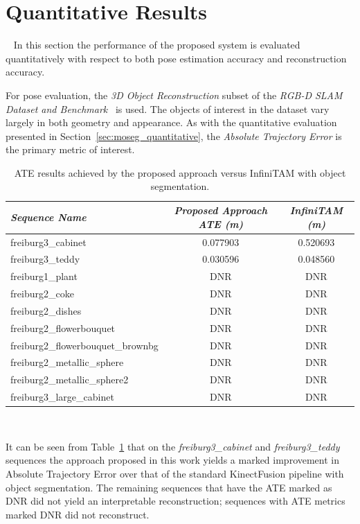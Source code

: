 \section{Quantitative Results}
~\label{sec:probobj_quantitative}
In this section the performance of the proposed system is evaluated quantitatively with respect 
to both pose estimation accuracy and reconstruction accuracy. 

For pose evaluation, the \textit{3D Object Reconstruction} subset of the 
\textit{RGB-D SLAM Dataset and Benchmark}~\cite{Sturm2012} is used. The objects of interest in 
the dataset vary largely in both geometry and appearance. As with the quantitative 
evaluation presented in Section~\ref{sec:moseg_quantitative}, the 
\textit{Absolute Trajectory Error} is the primary metric of interest.
\begin{table}[!htbp]
  \centering
  \begin{tabular}{l c c}
    \emph{Sequence Name} & \emph{Proposed Approach ATE (m)} & \emph{InfiniTAM (m)}\\
    \midrule
    \textsf{freiburg3\_cabinet} & 0.077903 & 0.520693\\
    \textsf{freiburg3\_teddy}   & 0.030596 & 0.048560 \\
    \textsf{freiburg1\_plant}   & DNR & DNR \\
    \textsf{freiburg2\_coke}   & DNR & DNR \\
    \textsf{freiburg2\_dishes}   & DNR & DNR \\
    \textsf{freiburg2\_flowerbouquet}   & DNR & DNR \\
    \textsf{freiburg2\_flowerbouquet\_brownbg}   & DNR & DNR \\
    \textsf{freiburg2\_metallic\_sphere}   & DNR & DNR \\
    \textsf{freiburg2\_metallic\_sphere2}   & DNR & DNR \\
    \textsf{freiburg3\_large\_cabinet}   & DNR & DNR
  \end{tabular}
  \caption[Probabilistic Object Reconstruction ATE]
  {ATE results achieved by the proposed approach versus InfiniTAM with object segmentation.}
~\label{table:probobj_ate}
\end{table}

It can be seen from Table~\ref{table:probobj_ate} that on the \textit{freiburg3\_cabinet} 
and \textit{\textsf{freiburg3\_teddy}} sequences the approach proposed in this work 
yields a marked improvement in Absolute Trajectory Error over that of the standard KinectFusion 
pipeline with object segmentation. The remaining sequences that have the ATE marked as DNR did 
not yield an interpretable reconstruction; sequences with ATE metrics marked DNR did not 
reconstruct. 

